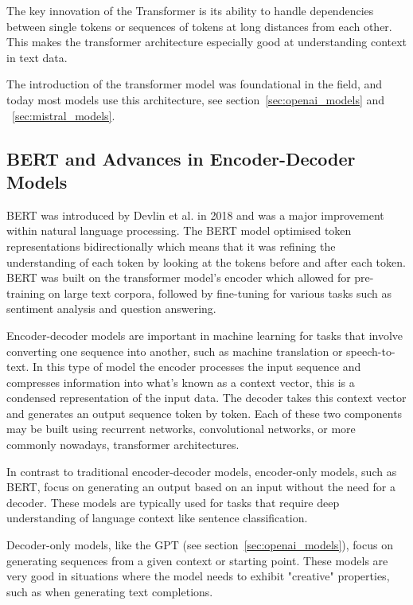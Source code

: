 The key innovation of the Transformer is its ability to handle dependencies between single tokens or sequences of tokens at long distances from each other. This makes the transformer architecture especially good at understanding context in text data.


The introduction of the transformer model was foundational in the field, and today most models use this architecture, see section~\ref{sec:openai_models} and ~\ref{sec:mistral_models}.


\subsection{BERT and Advances in Encoder-Decoder Models}
\label{sec:bert_and_encoder_decoder}


\gls{BERT} was introduced by Devlin et al. \cite{devlin_bert_2019-2} in 2018 and was a major improvement within natural language processing. The \gls{BERT} model optimised token representations bidirectionally which means that it was refining the understanding of each token by looking at the tokens before and after each token. \gls{BERT} was built on the transformer model’s encoder which allowed for pre-training on large text corpora, followed by fine-tuning for various tasks such as sentiment analysis and question answering.


Encoder-decoder models are important in machine learning for tasks that involve converting one sequence into another, such as machine translation or speech-to-text. In this type of model the encoder processes the input sequence and compresses information into what’s known as a context vector, this is a condensed representation of the input data. The decoder takes this context vector and generates an output sequence token by token. Each of these two components may be built using recurrent networks, convolutional networks, or more commonly nowadays, transformer architectures.


In contrast to traditional encoder-decoder models, encoder-only models, such as \gls{BERT}, focus on generating an output based on an input without the need for a decoder. These models are typically used for tasks that require deep understanding of language context like sentence classification.


Decoder-only models, like the \gls{GPT} (see section~\ref{sec:openai_models}), focus on generating sequences from a given context or starting point. These models are very good in situations where the model needs to exhibit "creative" properties, such as when generating text completions.



